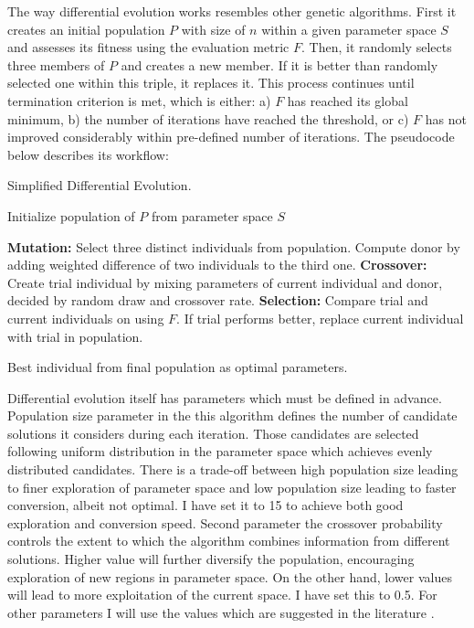 \documentclass[a4paper,12pt]{article}
\begin{document}
The way differential evolution works resembles other genetic algorithms. First it creates an initial population $P$ with size of $n$ within a given parameter space $S$ and assesses its fitness using the evaluation metric $F$. Then, it randomly selects three members of $P$ and creates a new member. If it is better than randomly selected one within this triple, it replaces it. This process continues until termination criterion is met, which is either: a) $F$ has reached its global minimum, b) the number of iterations have reached the threshold, or c) $F$ has not improved considerably within pre-defined number of iterations. The pseudocode below describes its workflow:

\begin{algorithm}
\caption{Simplified Differential Evolution.}
\begin{algorithmic}[1]

\State Initialize population of $P$ from parameter space $S$

        \State \textbf{Mutation:} Select three distinct individuals from population. Compute donor by adding weighted difference of two individuals to the third one.
        \State \textbf{Crossover:} Create trial individual by mixing parameters of current individual and donor, decided by random draw and crossover rate.
        \State \textbf{Selection:} Compare trial and current individuals on using $F$. If trial performs better, replace current individual with trial in population.
    \EndFor
\EndWhile

\State \Return Best individual from final population as optimal parameters.

\end{algorithmic}
\end{algorithm}

Differential evolution itself has parameters which must be defined in advance. Population size parameter in the this algorithm defines the number of candidate solutions it considers during each iteration. Those candidates are selected following uniform distribution in the parameter space which achieves evenly distributed candidates. There is a trade-off between high population size leading to finer exploration of parameter space and low population size leading to faster conversion, albeit not optimal. I have set it to 15 to achieve both good exploration and conversion speed. Second parameter the crossover probability controls the extent to which the algorithm combines information from different solutions. Higher value will further diversify the population, encouraging exploration of new regions in parameter space. On the other hand, lower values will lead to more exploitation of the current space. I have set this to 0.5. For other parameters I will use the values which are suggested in the literature \citep{omidi2020differential}.
\end{document}
